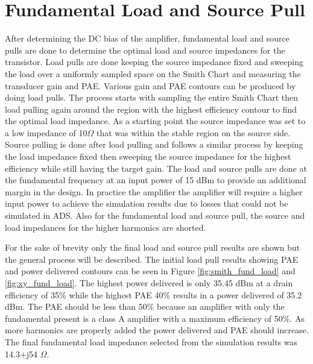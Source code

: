 
\section{Fundamental Load and Source Pull}

After determining the DC bias of the amplifier, fundamental load and source pulls are done to determine the optimal load and source impedances for the transistor. Load pulls are done keeping the source impedance fixed and sweeping the load over a uniformly sampled space on the Smith Chart and measuring the transducer gain and PAE. Various gain and PAE contours can be produced by doing load pulls. The process starts with sampling the entire Smith Chart then load pulling again around the region with the highest efficiency contour to find the optimal load impedance. As a starting point the source impedance was set to a low impedance of 10$\Omega$ that was within the stable region on the source side. Source pulling is done after load pulling and follows a similar process by keeping the load impedance fixed then sweeping the source impedance for the highest efficiency while still having the target gain. The load and source pulls are done at the fundamental frequency at an input power of 15 dBm to provide an additional margin in the design. In practice the amplifier the amplifier will require a higher input power to achieve the simulation results due to losses that could not be simulated in ADS. Also for the fundamental load and source pull, the source and load impedances for the higher harmonics are shorted.

For the sake of brevity only the final load and source pull results are shown but the general process will be described. The initial load pull results showing PAE and power delivered contours can be seen in Figure \ref{fig:smith_fund_load} and \ref{fig:xy_fund_load}. The highest power delivered is only 35.45 dBm at a drain efficiency of 35\% while the highest PAE 40\% results in a power delivered of 35.2 dBm. The PAE should be less than 50\% because an amplifier with only the fundamental present is a class A amplifier with a maximum efficiency of 50\%. As more harmonics are properly added the power delivered and PAE should increase. The final fundamental load impedance selected from the simulation results was 14.3+j54 $\Omega$.


